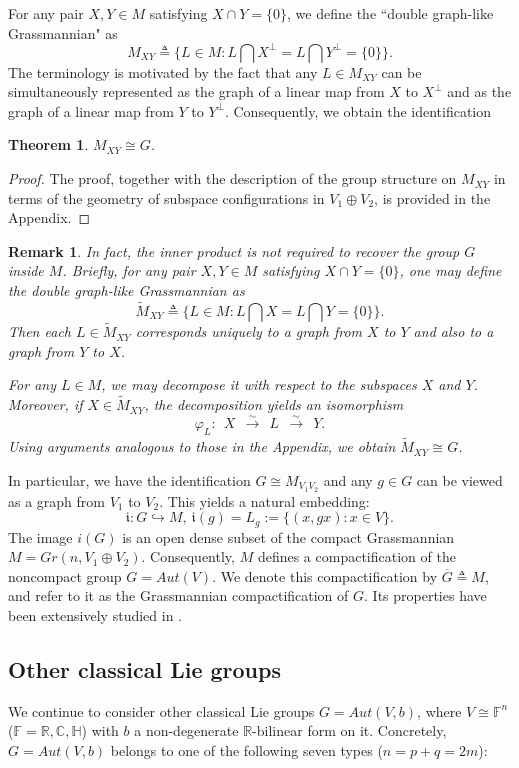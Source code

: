 \documentclass{article}
\newtheorem{thm}{Theorem}[section]
\newtheorem{rmk}{Remark}[section]
\begin{document}
For any pair $X, Y \in M$ satisfying  $X \cap Y=\{0\}$,  we define the ``double graph-like Grassmannian" as
\[
M_{XY} \triangleq \{L \in M: L \bigcap X^\perp=L \bigcap Y^\perp=\{0\}\}.
\]
The terminology is motivated by the fact that any $L \in M_{XY}$ can be simultaneously represented as the graph of a linear map from
$X$ to $X^\perp$ and as the graph of a linear map from $Y$ to $Y^\bot$. Consequently, we obtain the identification

\begin{thm}
$M_{XY} \cong G$.
\end{thm}
\begin{proof}
The proof, together with the description of the group structure on $M_{XY}$ in terms of the geometry of subspace configurations in $V_1\oplus V_2$, is provided in the Appendix.
\end{proof}

\begin{rmk}
In fact, the inner product is not required to recover the group $G$ inside $M$. Briefly, for any pair $X, Y \in M$ satisfying  $X \cap Y=\{0\}$,  one may define the double graph-like Grassmannian as
\[
\widetilde{M}_{XY}  \triangleq \{L \in M: L \bigcap X=L \bigcap Y=\{0\}\}.
\]
Then  each $ L \in \widetilde{M}_{XY} $ corresponds uniquely to a graph  from $ X $ to $Y $ and also to a graph from $Y$ to $X$.


For any $L \in M$, we may decompose it with respect to the subspaces  $X$ and $Y$. Moreover, if $X \in \widetilde{M}_{XY}$, the decomposition yields an isomorphism
\[
\varphi_{L} :  ~  ~  X  ~  ~  \xrightarrow[]{\sim}  ~  ~  L   ~  ~   \xrightarrow[]{\sim}   ~   ~ Y.
\]
Using arguments analogous to those in the Appendix, we obtain $\widetilde{M}_{XY} \cong G$.
\end{rmk}

In particular, we have the identification $G \cong M_{V_1V_2}$ and any $g \in G$ can be viewed as a graph from $V_1$ to $V_2$. This yields a natural embedding:
\[
\mathfrak{i}: G \hookrightarrow M, ~  \mathfrak{i}(g)= L_g:=\{(x, gx): x \in V\}.
\]
The image $i(G)$ is an open dense subset of the compact Grassmannian $M=Gr(n, V_1\oplus V_2)$.  Consequently,
$M$ defines a compactification of the noncompact group  $G=Aut(V)$. We denote this compactification by $\overline{G} \triangleq M$, and refer to it as the Grassmannian compactification of
$G$. Its properties have been extensively studied in \cite{FL}\cite{GGKW}\cite{He}.


\subsection{Other classical Lie groups}
We continue to consider other classical Lie groups $G=Aut(V,b)$, where $V \cong \mathbb{F}^n$ ($\mathbb{F}=\mathbb{R},\mathbb{C},\mathbb{H}$) with $b$ a non-degenerate $\mathbb{R}$-bilinear form on it.
Concretely, $G=Aut(V,b)$  belongs to one of the following seven types\cite{Har}\cite{K} ($n=p+q=2m$):
\end{document}
